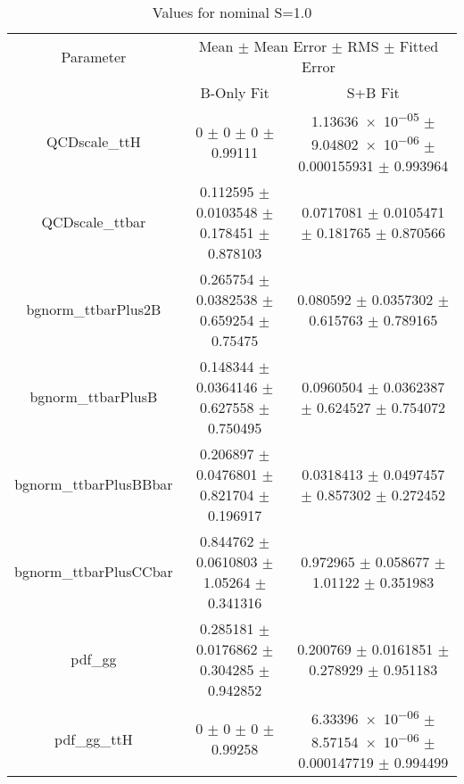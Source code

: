 \begin{table}
\centering
\caption{Values for nominal S=1.0}
\begin{tabular}{ccc}
\toprule
Parameter & \multicolumn{2}{c}{Mean $\pm$ Mean Error $\pm$ RMS $\pm$ Fitted Error}\\
 & B-Only Fit & S+B Fit\\
\midrule
QCDscale\_ttH & \num{0} $\pm$ \num{0} $\pm$ \num{0} $\pm$ \num{0.99111} & \num{1.13636e-05} $\pm$ \num{9.04802e-06} $\pm$ \num{0.000155931} $\pm$ \num{0.993964}\\
QCDscale\_ttbar & \num{0.112595} $\pm$ \num{0.0103548} $\pm$ \num{0.178451} $\pm$ \num{0.878103} & \num{0.0717081} $\pm$ \num{0.0105471} $\pm$ \num{0.181765} $\pm$ \num{0.870566}\\
bgnorm\_ttbarPlus2B & \num{0.265754} $\pm$ \num{0.0382538} $\pm$ \num{0.659254} $\pm$ \num{0.75475} & \num{0.080592} $\pm$ \num{0.0357302} $\pm$ \num{0.615763} $\pm$ \num{0.789165}\\
bgnorm\_ttbarPlusB & \num{0.148344} $\pm$ \num{0.0364146} $\pm$ \num{0.627558} $\pm$ \num{0.750495} & \num{0.0960504} $\pm$ \num{0.0362387} $\pm$ \num{0.624527} $\pm$ \num{0.754072}\\
bgnorm\_ttbarPlusBBbar & \num{0.206897} $\pm$ \num{0.0476801} $\pm$ \num{0.821704} $\pm$ \num{0.196917} & \num{0.0318413} $\pm$ \num{0.0497457} $\pm$ \num{0.857302} $\pm$ \num{0.272452}\\
bgnorm\_ttbarPlusCCbar & \num{0.844762} $\pm$ \num{0.0610803} $\pm$ \num{1.05264} $\pm$ \num{0.341316} & \num{0.972965} $\pm$ \num{0.058677} $\pm$ \num{1.01122} $\pm$ \num{0.351983}\\
pdf\_gg & \num{0.285181} $\pm$ \num{0.0176862} $\pm$ \num{0.304285} $\pm$ \num{0.942852} & \num{0.200769} $\pm$ \num{0.0161851} $\pm$ \num{0.278929} $\pm$ \num{0.951183}\\
pdf\_gg\_ttH & \num{0} $\pm$ \num{0} $\pm$ \num{0} $\pm$ \num{0.99258} & \num{6.33396e-06} $\pm$ \num{8.57154e-06} $\pm$ \num{0.000147719} $\pm$ \num{0.994499}\\
\bottomrule
\end{tabular}
\end{table}